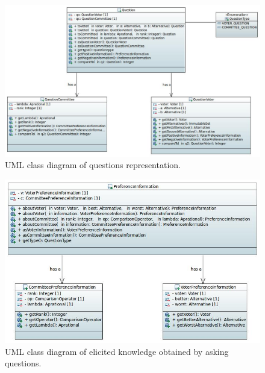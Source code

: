 \begin{figure}[h]
	\centering
	\includegraphics[width=\textwidth]{uml/questions.jpeg}
	\caption{UML class diagram of questions representation.}
\end{figure}

\begin{figure}[h]
	\centering
	\includegraphics[width=\textwidth]{uml/prefinfo.jpeg}
	\caption{UML class diagram of elicited knowledge obtained by asking questions.}
\end{figure}


